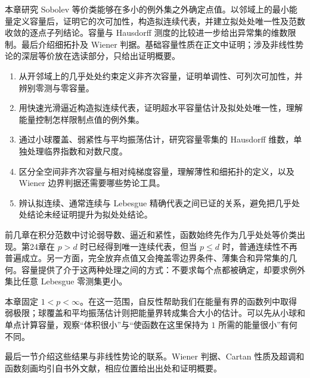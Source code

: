 \begin{chapterabstract}
本章研究 Sobolev 等价类能够在多小的例外集之外确定点值。以邻域上的最小能量定义容量后，证明它的次可加性，构造拟连续代表，并建立拟处处唯一性及范数收敛的逐点子列结论。容量与 Hausdorff 测度的比较进一步给出异常集的维数限制。最后介绍细拓扑及 Wiener 判据。基础容量性质在正文中证明；涉及非线性势论的深层等价放在选读部分，只给出证明概要。
\end{chapterabstract}

\begin{learninggoals}
\begin{enumerate}
\item\label{b1:goal:26-capacity}从开邻域上的几乎处处约束定义非齐次容量，证明单调性、可列次可加性，并辨别零测与零容量。
\item\label{b1:goal:26-representative}用快速光滑逼近构造拟连续代表，证明超水平容量估计及拟处处唯一性，理解能量控制怎样限制点值的例外集。
\item\label{b1:goal:26-dimension}通过小球覆盖、弱紧性与平均振荡估计，研究容量零集的 Hausdorff 维数，单独处理临界指数和对数尺度。
\item\label{b1:goal:26-fine}区分全空间非齐次容量与相对纯梯度容量，理解薄性和细拓扑的定义，以及 Wiener 边界判据还需要哪些势论工具。
\item\label{b1:goal:26-boundaries}辨认拟连续、通常连续与 Lebesgue 精确代表之间已证的关系，避免把几乎处处结论未经证明提升为拟处处结论。
\end{enumerate}
\end{learninggoals}

前几章在积分范数中讨论弱导数、逼近和紧性，函数始终先作为几乎处处等价类出现。第24章在 \(p>d\) 时已经得到唯一连续代表，但当 \(p\le d\) 时，普通连续性不再普遍成立。另一方面，完全放弃点值又会掩盖零边界条件、薄集合和异常集的几何。容量提供了介于这两种处理之间的方式：不要求每个点都被确定，却要求例外集比任意 Lebesgue 零测集更小。

\ProseParagraphBreak

本章固定 \(1<p<\infty\)。在这一范围，自反性帮助我们在能量有界的函数列中取得弱极限；球覆盖和平均振荡估计则把能量界转成集合大小的估计。可以先从小球和单点计算容量，观察“体积很小”与“使函数在这里保持为 \(1\) 所需的能量很小”有何不同。

\ProseParagraphBreak

最后一节介绍这些结果与非线性势论的联系。Wiener 判据、Cartan 性质及超调和函数刻画均引自书外文献，相应位置给出出处和证明概要。

